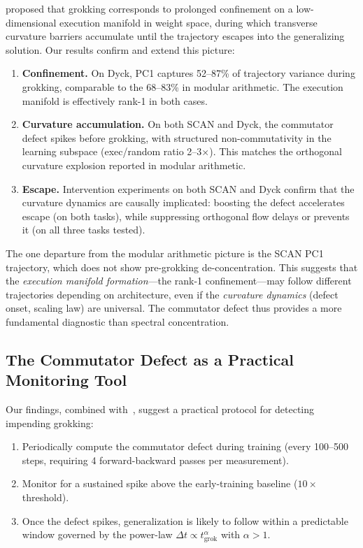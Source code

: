 \documentclass[11pt]{article}
\newcommand{\grokstep}{t_{\text{grok}}}
\newcommand{\leadtime}{\Delta t}
\begin{document}
\citet{xu2026integrability} proposed that grokking corresponds to prolonged confinement on a low-dimensional execution manifold in weight space, during which transverse curvature barriers accumulate until the trajectory escapes into the generalizing solution. Our results confirm and extend this picture:

\begin{enumerate}
  \item \textbf{Confinement.} On Dyck, PC1 captures 52--87\% of trajectory variance during grokking, comparable to the 68--83\% in modular arithmetic. The execution manifold is effectively rank-1 in both cases.
  \item \textbf{Curvature accumulation.} On both SCAN and Dyck, the commutator defect spikes before grokking, with structured non-commutativity in the learning subspace (exec/random ratio 2--3$\times$). This matches the orthogonal curvature explosion reported in modular arithmetic.
  \item \textbf{Escape.} Intervention experiments on both SCAN and Dyck confirm that the curvature dynamics are causally implicated: boosting the defect accelerates escape (on both tasks), while suppressing orthogonal flow delays or prevents it (on all three tasks tested).
\end{enumerate}

The one departure from the modular arithmetic picture is the SCAN PC1 trajectory, which does not show pre-grokking de-concentration. This suggests that the \emph{execution manifold formation}---the rank-1 confinement---may follow different trajectories depending on architecture, even if the \emph{curvature dynamics} (defect onset, scaling law) are universal. The commutator defect thus provides a more fundamental diagnostic than spectral concentration.

\subsection{The Commutator Defect as a Practical Monitoring Tool}

Our findings, combined with~\citet{xu2026integrability}, suggest a practical protocol for detecting impending grokking:
\begin{enumerate}
  \item Periodically compute the commutator defect during training (every 100--500 steps, requiring 4 forward-backward passes per measurement).
  \item Monitor for a sustained spike above the early-training baseline ($10\times$ threshold).
  \item Once the defect spikes, generalization is likely to follow within a predictable window governed by the power-law $\leadtime \propto \grokstep^\alpha$ with $\alpha > 1$.
\end{enumerate}
\end{document}
